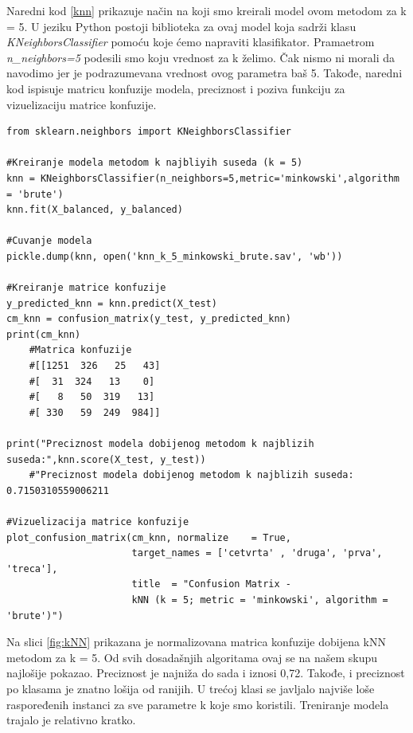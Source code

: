 \documentclass[a4paper]{article}
\begin{document}
Naredni kod \ref{knn} prikazuje način na koji smo kreirali model ovom metodom za k = 5. U jeziku Python postoji biblioteka za ovaj model koja sadrži klasu {\em KNeighborsClassifier} pomoću koje ćemo napraviti klasifikator. Pramaetrom {\em n\_neighbors=5} podesili smo koju vrednost za k želimo. Čak nismo ni morali da navodimo jer je podrazumevana vrednost ovog parametra baš 5. Takođe, naredni kod ispisuje matricu konfuzije modela, preciznost i poziva funkciju za vizuelizaciju matrice konfuzije.
\\
\begin{lstlisting}[caption={Kreiranje modela algoritmom kNN i prikaz rezultata},frame=single, label=knn]
from sklearn.neighbors import KNeighborsClassifier

#Kreiranje modela metodom k najbliyih suseda (k = 5)
knn = KNeighborsClassifier(n_neighbors=5,metric='minkowski',algorithm = 'brute')
knn.fit(X_balanced, y_balanced)

#Cuvanje modela
pickle.dump(knn, open('knn_k_5_minkowski_brute.sav', 'wb'))

#Kreiranje matrice konfuzije
y_predicted_knn = knn.predict(X_test)
cm_knn = confusion_matrix(y_test, y_predicted_knn)
print(cm_knn)
    #Matrica konfuzije
    #[[1251  326   25   43]
 	#[  31  324   13    0]
 	#[   8   50  319   13]
 	#[ 330   59  249  984]]

print("Preciznost modela dobijenog metodom k najblizih suseda:",knn.score(X_test, y_test))
    #"Preciznost modela dobijenog metodom k najblizih suseda:   0.7150310559006211

#Vizuelizacija matrice konfuzije
plot_confusion_matrix(cm_knn, normalize    = True,
                      target_names = ['cetvrta' , 'druga', 'prva', 'treca'],
                      title  = "Confusion Matrix - 
                      kNN (k = 5; metric = 'minkowski', algorithm = 'brute')")
\end{lstlisting}

Na slici \ref{fig:kNN} prikazana je normalizovana matrica konfuzije dobijena kNN metodom za k = 5. Od svih dosadašnjih algoritama ovaj se na našem skupu najlošije pokazao. Preciznost je najniža do sada i iznosi 0,72. Takođe, i preciznost po klasama je znatno lošija od ranijih. U trećoj klasi se javljalo najviše loše raspoređenih instanci za sve parametre k koje smo koristili. Treniranje modela trajalo je relativno kratko.
\newpage
\end{document}
